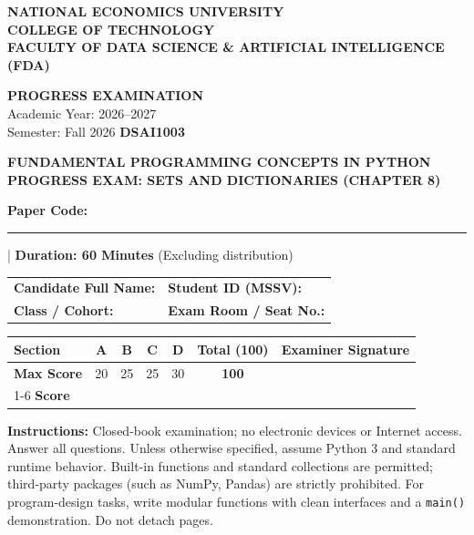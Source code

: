 \documentclass[11pt,a4paper]{article}
\begin{document}
\noindent
\begin{minipage}[t]{0.63\textwidth}\raggedright\small
\textbf{NATIONAL ECONOMICS UNIVERSITY}\\
\textbf{COLLEGE OF TECHNOLOGY}\\
\textbf{FACULTY OF DATA SCIENCE \& ARTIFICIAL INTELLIGENCE (FDA)}
\end{minipage}\hfill
\begin{minipage}[t]{0.35\textwidth}\raggedleft\footnotesize
\textbf{PROGRESS EXAMINATION}\\
Academic Year: 2026--2027\\
Semester: Fall 2026 \quad \textbf{DSAI1003}
\end{minipage}
\vspace{0.1em}
\begin{center}
{\Large\bfseries\color{primaryblue} FUNDAMENTAL PROGRAMMING CONCEPTS IN PYTHON}\\[0.05em]
{\normalsize\bfseries PROGRESS EXAM: SETS AND DICTIONARIES (CHAPTER 8)}\\[0.05em]
{\normalsize\textbf{Paper Code:} \rule{1.5cm}{0.4pt} \quad | \quad \textbf{Duration: 60 Minutes} (Excluding distribution)}
\end{center}
\begin{headerbox}
\begin{tabularx}{\linewidth}{@{}X X@{}}
\textbf{Candidate Full Name:} \dotfill & \textbf{Student ID (MSSV):} \dotfill \\[0.15em]
\textbf{Class / Cohort:} \dotfill & \textbf{Exam Room / Seat No.:} \dotfill
\end{tabularx}
\vspace{1.5mm}
\centering\setlength{\tabcolsep}{4pt}\renewcommand{\arraystretch}{1.05}
\begin{tabular}{|l|c|c|c|c||c|c|}\hline
\textbf{Section} & \textbf{A} & \textbf{B} & \textbf{C} & \textbf{D} & \textbf{Total (100)} & \textbf{Examiner Signature} \\ \hline
\textbf{Max Score} & 20 & 25 & 25 & 30 & \textbf{100} & \\[0.2em] \cline{1-6}
\textbf{Score} & & & & & & \\[0.35em] \hline
\end{tabular}
\vspace{1mm}\raggedright\scriptsize
\textbf{Instructions:} Closed-book examination; no electronic devices or Internet access. Answer all questions. Unless otherwise specified, assume Python 3 and standard runtime behavior. Built-in functions and standard collections are permitted; third-party packages (such as NumPy, Pandas) are strictly prohibited. For program-design tasks, write modular functions with clean interfaces and a \texttt{main()} demonstration. Do not detach pages.
\end{headerbox}
\end{document}
